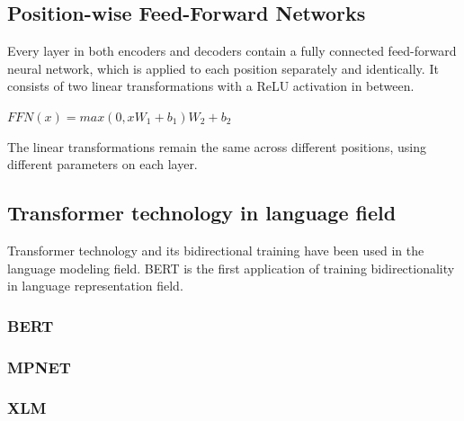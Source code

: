 \documentclass[\main/main.tex]{subfiles}
\begin{document}
\subsection{Position-wise Feed-Forward Networks}
Every layer in both encoders and decoders contain a fully connected feed-forward neural network, which is applied to each position separately and identically.
It consists of two linear transformations with a ReLU activation in between.
\begin{center}
    $FFN(x) = max(0, xW_1 + b_1)W_2 + b_2$
\end{center}
The linear transformations remain the same across different positions, using different parameters on each layer. 

\subsection{Transformer technology in language field}
Transformer technology and its bidirectional training have been used in the language modeling field. BERT \cite{devlin2018bert} is the first application of training bidirectionality in language representation field.
\subsubsection{BERT}
\subsubsection{MPNET}
\subsubsection{XLM}
\end{document}
